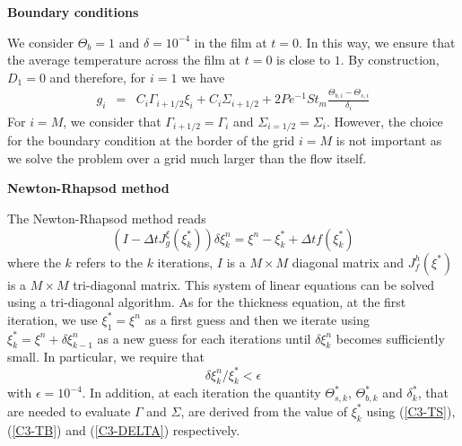 \vspace{.5cm} \textbf{Boundary conditions} \vspace{.5cm}

We  consider $\Theta_b  =1$  and $\delta  = 10^{-4}$  in  the film  at
$t=0$. In this way, we ensure  that the average temperature across the
film at $t=0$ is close to $1$. By construction, $D_1=0$ and therefore,
for $i=1$ we have
\begin{eqnarray}
  g_i &=& C_i\Gamma_{i+1/2}\xi_{i}+ C_i\Sigma_{i+1/2} +2Pe^{-1}St_m\frac{\Theta_{b,i}-\Theta_{s,i}}{\delta_i}
\end{eqnarray}
For   $i=M$,   we    consider   that   $\Gamma_{i+1/2}=\Gamma_i$   and
$\Sigma_{i=1/2}=\Sigma_i$.   However,  the  choice  for  the  boundary
condition at the border of the grid $i=M$ is not important as we solve
the problem over a grid much larger than the flow itself.

\vspace{.5cm} \textbf{Newton-Rhapsod method} \vspace{.5cm}

The Newton-Rhapsod method reads
\begin{equation}
  (I-\Delta tJ^{\xi}_{g}(\xi_k^*))\delta \xi_k^n=\xi^n-\xi_k^*+\Delta t f(\xi_k^*)
\end{equation}
where the  $k$ refers  to the $k$  iterations, $I$ is  a $M  \times M$
diagonal  matrix and  $J_f^h(\xi^*)$ is  a $M  \times M$  tri-diagonal
matrix.   This  system of  linear  equations  can  be solved  using  a
tri-diagonal algorithm.  As for the  thickness equation, at  the first
iteration,  we use  $\xi^*_1 =  \xi^n$ as  a first  guess and  then we
iterate using $\xi^*_k = \xi^n+\delta  \xi_{k-1}^n$ as a new guess for
each iterations  until $\delta \xi^n_{k}$ becomes  sufficiently small.
In particular, we require that
\begin{equation}
  \delta \xi^n_k/\xi^*_{k}<\epsilon
\end{equation}
with $\epsilon = 10^{-4}$. In addition, at each iteration the quantity
$\Theta^*_{s,k}$, $\Theta^*_{b,k}$ and $\delta^*_k$, that are needed to evaluate $\Gamma$ and
$\Sigma$,  are  derived from  the value of  $\xi^*_{k}$  using
(\ref{C3-TS}), (\ref{C3-TB}) and (\ref{C3-DELTA}) respectively.

